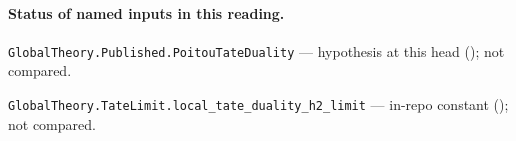 

\paragraph{Status of named inputs in this reading.}
\noindent\nolinkurl{GlobalTheory.Published.PoitouTateDuality} --- hypothesis at this head (); not compared.\par
\noindent\nolinkurl{GlobalTheory.TateLimit.local_tate_duality_h2_limit} --- in-repo constant (); not compared.\par

